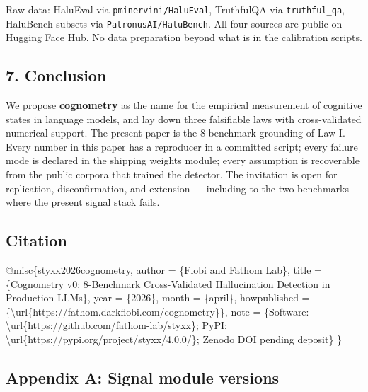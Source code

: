 \documentclass[
  11pt]{article}
\newenvironment{Shaded}{}{}
\newcommand{\CharTok}[1]{\textcolor[rgb]{0.25,0.44,0.63}{#1}}
\newcommand{\DataTypeTok}[1]{\textcolor[rgb]{0.56,0.13,0.00}{#1}}
\newcommand{\NormalTok}[1]{#1}
\newcommand{\OtherTok}[1]{\textcolor[rgb]{0.00,0.44,0.13}{#1}}
\newcommand{\VariableTok}[1]{\textcolor[rgb]{0.10,0.09,0.49}{#1}}
\begin{document}
Raw data: HaluEval via \texttt{pminervini/HaluEval}, TruthfulQA via
\texttt{truthful\_qa}, HaluBench subsets via
\texttt{PatronusAI/HaluBench}. All four sources are public on Hugging
Face Hub. No data preparation beyond what is in the calibration scripts.

\subsection{7. Conclusion}\label{conclusion}

We propose \textbf{cognometry} as the name for the empirical measurement
of cognitive states in language models, and lay down three falsifiable
laws with cross-validated numerical support. The present paper is the
8-benchmark grounding of Law I. Every number in this paper has a
reproducer in a committed script; every failure mode is declared in the
shipping weights module; every assumption is recoverable from the public
corpora that trained the detector. The invitation is open for
replication, disconfirmation, and extension --- including to the two
benchmarks where the present signal stack fails.

\subsection{Citation}\label{citation}

\begin{Shaded}
\begin{Highlighting}[]
\VariableTok{@misc}\NormalTok{\{}\OtherTok{styxx2026cognometry}\NormalTok{,}
  \DataTypeTok{author}\NormalTok{ = \{Flobi and Fathom Lab\},}
  \DataTypeTok{title}\NormalTok{  = \{Cognometry v0: 8{-}Benchmark Cross{-}Validated Hallucination}
\NormalTok{            Detection in Production LLMs\},}
  \DataTypeTok{year}\NormalTok{   = \{2026\},}
  \DataTypeTok{month}\NormalTok{  = \{april\},}
  \DataTypeTok{howpublished}\NormalTok{ = \{}\CharTok{\textbackslash{}url}\NormalTok{\{https://fathom.darkflobi.com/cognometry\}\},}
  \DataTypeTok{note}\NormalTok{   = \{Software: }\CharTok{\textbackslash{}url}\NormalTok{\{https://github.com/fathom{-}lab/styxx\};}
\NormalTok{            PyPI: }\CharTok{\textbackslash{}url}\NormalTok{\{https://pypi.org/project/styxx/4.0.0/\};}
\NormalTok{            Zenodo DOI pending deposit\}}
\NormalTok{\}}
\end{Highlighting}
\end{Shaded}

\subsection{Appendix A: Signal module
versions}\label{appendix-a-signal-module-versions}
\end{document}
